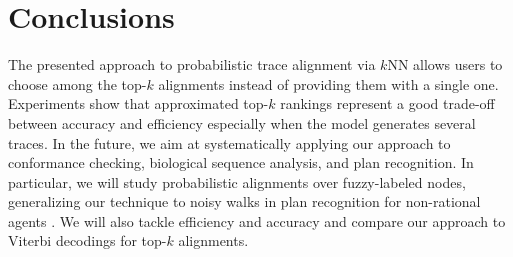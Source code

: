 
\section{Conclusions}
\label{sec:conclusion}

The presented approach to probabilistic trace alignment via $k$NN allows users to choose among the top-$k$ alignments instead of providing them with a single one. Experiments show that approximated top-$k$ rankings represent a good trade-off between accuracy and efficiency especially when the model generates several traces. In the future, we aim at systematically applying our approach to conformance checking, biological sequence analysis, and plan recognition. In particular, we will study probabilistic alignments over fuzzy-labeled nodes, generalizing our technique to noisy walks in plan recognition for non-rational agents \cite{RamirezG10}. We will also tackle efficiency and accuracy and compare our approach to Viterbi decodings for top-$k$ alignments.
